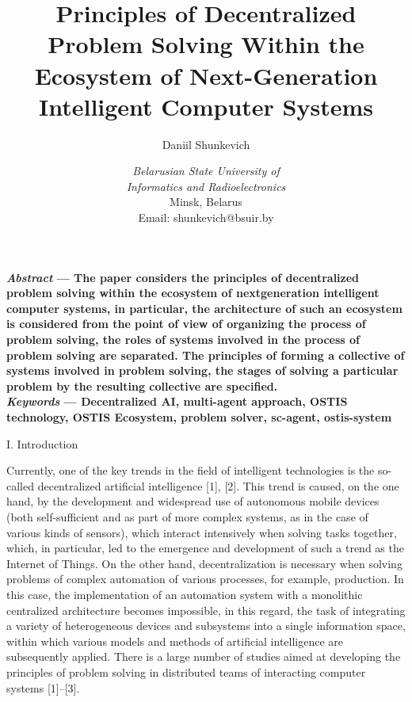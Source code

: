 \documentclass[a4paper,10pt]{article}
\title{\huge \vspace{-1cm}\textbf{Principles of Decentralized Problem Solving
Within the Ecosystem of Next-Generation
Intelligent Computer Systems}}
\author{Daniil Shunkevich}
\date{\vspace{-0.3cm}\textit{Belarusian State University of\\
Informatics and Radioelectronics
} \\
Minsk, Belarus\\
Email: shunkevich@bsuir.by}
\begin{document}
\maketitle
\begin{multicols}{2}    %
\textbf{\textit{Abstract} — The paper considers the principles of decentralized problem solving within the ecosystem of nextgeneration intelligent computer systems, in particular, the
architecture of such an ecosystem is considered from the
point of view of organizing the process of problem solving,
the roles of systems involved in the process of problem
solving are separated. The principles of forming a collective
of systems involved in problem solving, the stages of solving
a particular problem by the resulting collective are specified.} \\

\textbf{\textit{Keywords} — Decentralized AI, multi-agent approach, OSTIS technology, OSTIS Ecosystem, problem solver, sc-agent,
ostis-system}

\begin{center}
    I. Introduction 
\end{center}



Currently, one of the key trends in the field of intelligent technologies is the so-called decentralized artificial
intelligence [1], [2]. This trend is caused, on the one hand,
by the development and widespread use of autonomous
mobile devices (both self-sufficient and as part of more
complex systems, as in the case of various kinds of
sensors), which interact intensively when solving tasks
together, which, in particular, led to the emergence and
development of such a trend as the Internet of Things.
On the other hand, decentralization is necessary when
solving problems of complex automation of various
processes, for example, production. In this case, the
implementation of an automation system with a monolithic centralized architecture becomes impossible, in this
regard, the task of integrating a variety of heterogeneous
devices and subsystems into a single information space,
within which various models and methods of artificial
intelligence are subsequently applied. There is a large
number of studies aimed at developing the principles
of problem solving in distributed teams of interacting
computer systems [1]–[3]. 



\end{multicols}
\end{document}
